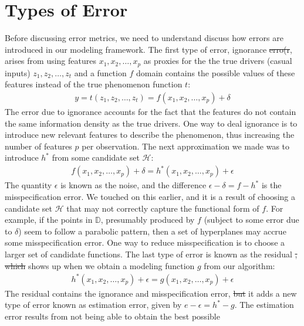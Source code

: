 \documentclass[12pt]{article}
\providecommand{\DIFaddtex}[1]{{\protect\color{blue}\uwave{#1}}} %
\providecommand{\DIFdeltex}[1]{{\protect\color{red}\sout{#1}}}                      %
\providecommand{\DIFaddbegin}{} %
\providecommand{\DIFaddend}{} %
\providecommand{\DIFdelbegin}{} %
\providecommand{\DIFdelend}{} %
\providecommand{\DIFadd}[1]{\texorpdfstring{\DIFaddtex{#1}}{#1}} %
\providecommand{\DIFdel}[1]{\texorpdfstring{\DIFdeltex{#1}}{}} %
\begin{document}
	\section{Types of Error}
	Before discussing error metrics, we need to understand discuss how errors
	are introduced in our modeling framework. The first type of error, ignorance
	\DIFdelbegin \DIFdel{erro(r}\DIFdelend \DIFaddbegin \DIFadd{error}\DIFaddend , arises from using features $x_1,x_2,\ldots,x_p$ as proxies for
	the the true drivers (casual inputs) $z_1,z_2,\ldots,z_t$ and a function
	$f$ domain contains the possible values of these features instead of
	the true phenomenon function $t$:
	\begin{align*}
		y = t(z_1,z_2,\ldots,z_t)=f(x_1,x_2,\ldots,x_p) +\delta
	\end{align*}
	The error due to ignorance accounts for the fact that the features do not
	contain the same information density as the true drivers. One way to
	deal ignorance is to introduce new relevant features to describe the
	phenomenon, thus increasing the number of features $p$ per observation.
	The next approximation we made was to introduce $h^*$ from some candidate
	set $\mathcal{H}$:
	\begin{align*}
		f(x_1,x_2,\ldots,x_p) + \delta = h^*(x_1,x_2,\ldots,x_p) + \epsilon
	\end{align*}
	The quantity $\epsilon$ is known as the noise, and the difference
	$\epsilon-\delta=f-h^*$ is the misspecification error. We touched on this
	earlier, and it is a result of choosing a candidate set $\mathcal{H}$ that
	may not correctly capture the functional form of $f$. For example, if the
	points in $\mathbb{D}$, presumably produced by $f$ (subject to some error
	due to $\delta$) seem to follow a parabolic pattern, then a set of
	hyperplanes may accrue some misspecification error. One way to reduce
	misspecification is to choose a larger set of candidate functions.
	The last type of error is known as the residual \DIFdelbegin \DIFdel{, which }\DIFdelend \DIFaddbegin \DIFadd{error, and }\DIFaddend shows up when we obtain a modeling function $g$ from our algorithm:
	\begin{align*}
		h^*(x_1,x_2,\ldots,x_p) + \epsilon = g(x_1,x_2,\ldots,x_p) + \epsilon
	\end{align*}
	The residual contains the ignorance and misspecification error, \DIFdelbegin \DIFdel{but }\DIFdelend \DIFaddbegin \DIFadd{and }\DIFaddend it
	adds a new type of error known as estimation error, given by $e-\epsilon = h^*-g$.
	The estimation error results from not being able to obtain the best possible
\end{document}
